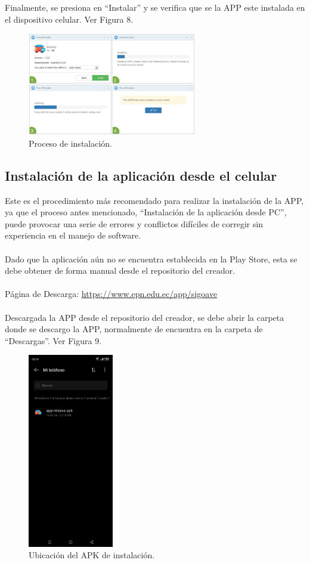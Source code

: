 \documentclass[a4paper,10pt, oneside, titlepage]{article}
\begin{document}
	Finalmente, se presiona en ``Instalar'' y se verifica que se la APP este instalada en el dispositivo celular. Ver Figura 8.
	\begin{figure}[h]
		\centering
		\includegraphics[width = 0.7\linewidth, height = 4.5cm]{8.jpg}
		\caption{Proceso de instalación.}
	\end{figure}
	
	\subsection{Instalación de la aplicación desde el celular}
	Este es el procedimiento más recomendado para realizar la instalación de la APP, ya que el proceso antes mencionado, ``Instalación de la aplicación desde PC'', puede provocar una serie de errores y conflictos difíciles de corregir sin experiencia en el manejo de software.\\\\
	Dado que la aplicación aún no se encuentra establecida en la Play Store, esta se debe obtener de forma manual desde el repositorio del creador.\\\\
	Página de Descarga: \textcolor{blue}{\url{https://www.epn.edu.ec/app/sigoave}}\\\\
	Descargada la APP desde el repositorio del creador, se debe abrir la carpeta donde se descargo la APP, normalmente de encuentra en la carpeta de ``Descargas''. Ver Figura 9.
	\begin{figure}[!h]
		\centering
		\includegraphics[width = 0.45\linewidth, height = 8.5cm]{9.jpeg}
		\caption{Ubicación del APK de instalación.}
	\end{figure}\\
\end{document}
